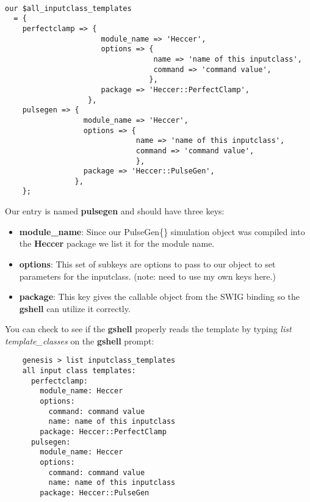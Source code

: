 \documentclass[12pt]{article}
\begin{document}
\begin{verbatim}

our $all_inputclass_templates 
  = {
    perfectclamp => {
                      module_name => 'Heccer',
                      options => {
                                  name => 'name of this inputclass',
                                  command => 'command value',
                                 },
                      package => 'Heccer::PerfectClamp',
			       },
    pulsegen => {
                  module_name => 'Heccer',
                  options => {
                              name => 'name of this inputclass',
                              command => 'command value',
                              },
                  package => 'Heccer::PulseGen',
                },
    };
\end{verbatim}

Our entry is named {\bf pulsegen} and should have three keys:

\begin{itemize}
\item[] {\bf module\_name}: Since our PulseGen\{\} simulation object was compiled into the {\bf Heccer} package we list it for the module name.
\item[] {\bf options}: This set of subkeys are options to pass to our object to set parameters for the inputclass. (note: need to use my own keys here.)
\item[] {\bf package}: This key gives the callable object from the SWIG binding so the {\bf gshell} can utilize it correctly.
\end{itemize}

You can check to see if the {\bf gshell} properly reads the template by typing {\it list template\_classes} on the {\bf gshell} prompt:

\begin{verbatim}
	genesis > list inputclass_templates                                                   
	all input class templates:
	  perfectclamp:
	    module_name: Heccer
	    options:
	      command: command value
	      name: name of this inputclass
	    package: Heccer::PerfectClamp
	  pulsegen:
	    module_name: Heccer
	    options:
	      command: command value
	      name: name of this inputclass
	    package: Heccer::PulseGen
\end{verbatim}
\end{document}
